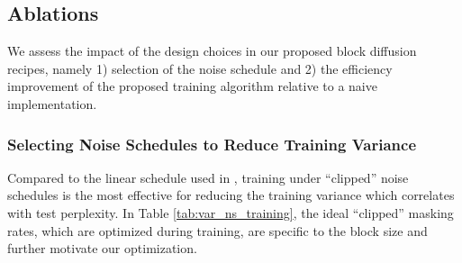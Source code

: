 \documentclass{article} %
\def\algos{BD3-LMs}
\begin{document}
\subsection{Ablations}\label{sec:ablation}
We assess the impact of the design choices in our proposed block diffusion recipes, namely 1) selection of the noise schedule and 2) the efficiency improvement of the proposed training algorithm relative to a naive implementation.

\subsubsection*{Selecting Noise Schedules to Reduce Training Variance}


Compared to the linear schedule used in \citet{lou2024discrete, sahoo2024simple}, training under ``clipped'' noise schedules is the most effective for reducing the training variance which correlates with test perplexity. In Table \ref{tab:var_ns_training}, the ideal ``clipped'' masking rates, which are optimized during training, are specific to the block size and further motivate our optimization. 
\end{document}
